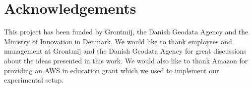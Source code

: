 \section{Acknowledgements}
This project has been funded by Grontmij, the Danish Geodata Agency and the Ministry of Innovation in Denmark. We would like to thank employees and management at Grontmij and the Danish Geodata Agency for great discussions about the ideas presented in this work. We would also like to thank Amazon for providing an AWS in education grant which we used to implement our experimental setup.